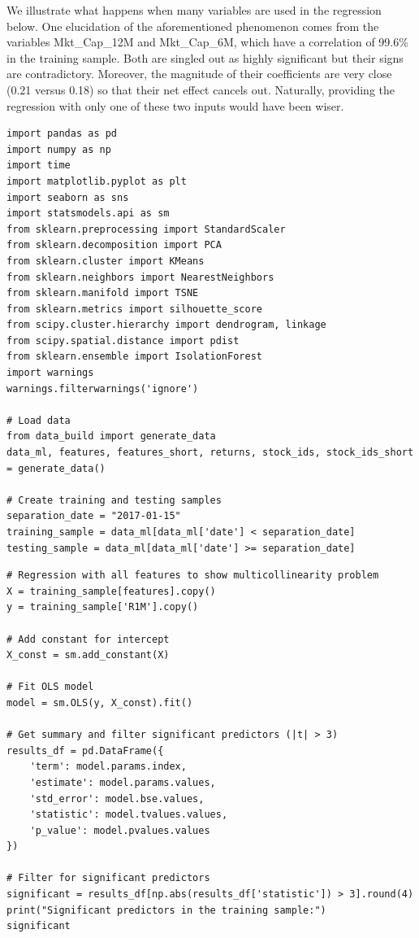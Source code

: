We illustrate what happens when many variables are used in the regression below. One elucidation of the aforementioned phenomenon comes from the variables Mkt\_Cap\_12M and Mkt\_Cap\_6M, which have a correlation of 99.6\% in the training sample. Both are singled out as highly significant but their signs are contradictory. Moreover, the magnitude of their coefficients are very close (0.21 versus 0.18) so that their net effect cancels out. Naturally, providing the regression with only one of these two inputs would have been wiser.

\begin{verbatim}
import pandas as pd
import numpy as np
import time
import matplotlib.pyplot as plt
import seaborn as sns
import statsmodels.api as sm
from sklearn.preprocessing import StandardScaler
from sklearn.decomposition import PCA
from sklearn.cluster import KMeans
from sklearn.neighbors import NearestNeighbors
from sklearn.manifold import TSNE
from sklearn.metrics import silhouette_score
from scipy.cluster.hierarchy import dendrogram, linkage
from scipy.spatial.distance import pdist
from sklearn.ensemble import IsolationForest
import warnings
warnings.filterwarnings('ignore')

# Load data
from data_build import generate_data                                                              
data_ml, features, features_short, returns, stock_ids, stock_ids_short = generate_data()          
                                                                                                    
# Create training and testing samples                                                             
separation_date = "2017-01-15"                                                                    
training_sample = data_ml[data_ml['date'] < separation_date]                                      
testing_sample = data_ml[data_ml['date'] >= separation_date]
\end{verbatim}

\begin{verbatim}
# Regression with all features to show multicollinearity problem
X = training_sample[features].copy()
y = training_sample['R1M'].copy()

# Add constant for intercept
X_const = sm.add_constant(X)

# Fit OLS model
model = sm.OLS(y, X_const).fit()

# Get summary and filter significant predictors (|t| > 3)
results_df = pd.DataFrame({
    'term': model.params.index,
    'estimate': model.params.values,
    'std_error': model.bse.values,
    'statistic': model.tvalues.values,
    'p_value': model.pvalues.values
})

# Filter for significant predictors
significant = results_df[np.abs(results_df['statistic']) > 3].round(4)
print("Significant predictors in the training sample:")
significant
\end{verbatim}

